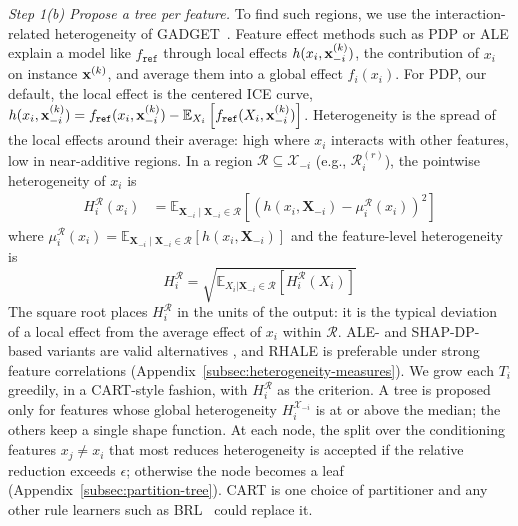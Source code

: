 \textit{Step 1(b) Propose a tree per feature.}
To find such regions, we use the interaction-related heterogeneity of GADGET~\cite{herbinger2024GADGET}.
Feature effect methods such as PDP or ALE explain a model like $f_{\texttt{ref}}$ through local effects \(h(x_i, \mathbf{x}_{-i}^{(k)})\), the contribution of $x_i$ on instance $\mathbf{x}^{(k)}$, and average them into a global effect $f_i(x_i)$.
For PDP, our default, the local effect is the centered ICE curve, \(h(x_i, \mathbf{x}_{-i}^{(k)}) = f_{\texttt{ref}}(x_i, \mathbf{x}_{-i}^{(k)}) - \mathbb{E}_{X_i}\left[f_{\texttt{ref}}(X_i, \mathbf{x}_{-i}^{(k)})\right]\).
Heterogeneity is the spread of the local effects around their average: high where $x_i$ interacts with other features, low in near-additive regions.
In a region \(\mathcal{R} \subseteq \mathcal{X}_{-i}\) (e.g., \(\mathcal{R}_i^{(r)}\)), the pointwise heterogeneity of $x_i$ is
\begin{equation}
\begin{aligned}
H_i^{\mathcal{R}}(x_i) &= \mathbb{E}_{\mathbf{X}_{-i}\mid \mathbf{X}_{-i} \in \mathcal{R}}\left[\left ( h(x_i , \mathbf{X}_{-i}) - \mu_i^{\mathcal{R}}(x_i) \right )^2\right]
\end{aligned}
\label{eq:pointwiseh}
\end{equation}
where $\mu_i^{\mathcal{R}}(x_i) = \mathbb{E}_{\mathbf{X}_{-i}\mid \mathbf{X}_{-i} \in \mathcal{R}}\left[h(x_i , \mathbf{X}_{-i})\right]$ and the feature-level heterogeneity is
\begin{equation}
    H^{\mathcal{R}}_i=\sqrt{\mathbb{E}_{X_i|\mathbf{X}_{-i}\in \mathcal{R}}\left[H_i^{\mathcal{R}}(X_i)\right]}
    \label{eq:heterogeneity}
\end{equation}
The square root places $H^{\mathcal{R}}_i$ in the units of the output: it is the typical deviation of a local effect from the average effect of $x_i$ within $\mathcal{R}$.
ALE- and SHAP-DP-based variants are valid alternatives \citep{herbinger2022REPID, herbinger2024GADGET}, and RHALE \citep{gkolemis2023rhale} is preferable under strong feature correlations (Appendix~\ref{subsec:heterogeneity-measures}).
We grow each $T_i$ greedily, in a CART-style fashion, with $H_i^{\mathcal{R}}$ as the criterion.
A tree is proposed only for features whose global heterogeneity $H_i^{\mathcal{X}_{-i}}$ is at or above the median; the others keep a single shape function.
At each node, the split over the conditioning features $x_j \neq x_i$ that most reduces heterogeneity is accepted if the relative reduction exceeds $\epsilon$; otherwise the node becomes a leaf (Appendix~\ref{subsec:partition-tree}).
CART is one choice of partitioner and any other rule learners such as BRL~\citep{letham2015stroke} could replace it.

